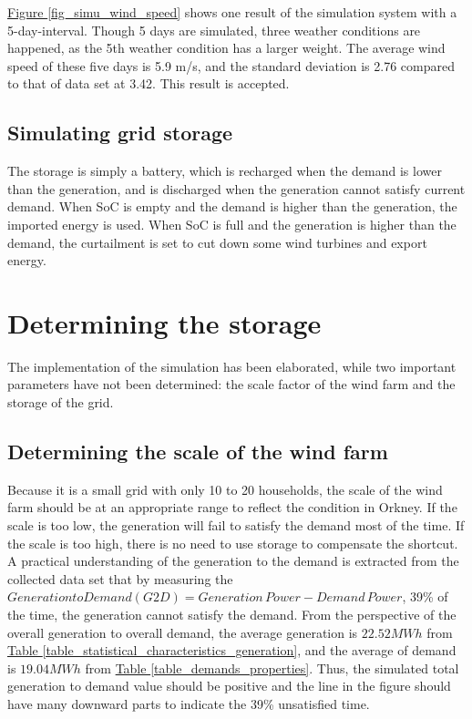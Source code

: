 \documentclass[12pt,a4paper]{report}
\begin{document}
                \hyperref[fig_simu_wind_speed]{Figure \ref*{fig_simu_wind_speed}} shows one result of the simulation system with a 5-day-interval. Though 5 days are simulated, three weather conditions are happened, as the 5th weather condition has a larger weight. The average wind speed of these five days is 5.9 m/s, and the standard deviation is 2.76 compared to that of data set at 3.42. This result is accepted.

                \subsection{Simulating grid storage}
                The storage is simply a battery, which is recharged when the demand is lower than the generation, and is discharged when the generation cannot satisfy current demand. When SoC is empty and the demand is higher than the generation, the imported energy is used. When SoC is full and the generation is higher than the demand, the curtailment is set to cut down some wind turbines and export energy.

            \section{Determining the storage}
            The implementation of the simulation has been elaborated, while two important parameters have not been determined: the scale factor of the wind farm and the storage of the grid. 

            \subsection{Determining the scale of the wind farm}
            Because it is a small grid with only 10 to 20 households, the scale of the wind farm should be at an appropriate range to reflect the condition in Orkney. If the scale is too low, the generation will fail to satisfy the demand most of the time. If the scale is too high, there is no need to use storage to compensate the shortcut. A practical understanding of the generation to the demand is extracted from the collected data set that by measuring the $Generation to Demand (G2D) = Generation\, Power - Demand\, Power $, 39\% of the time, the generation cannot satisfy the demand. From the perspective of the overall generation to overall demand, the average generation is $22.52 MWh$ from \hyperref[table_statistical_characteristics_generation]{Table \ref*{table_statistical_characteristics_generation}}, and the average of demand is $19.04 MWh$ from \hyperref[table_demands_properties]{Table \ref*{table_demands_properties}}. Thus, the simulated total generation to demand value should be positive and the line in the figure should have many downward parts to indicate the 39\% unsatisfied time.
\end{document}
